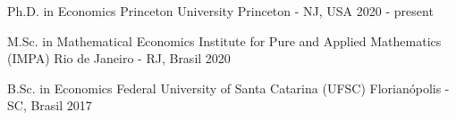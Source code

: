 

\begin{cventries}

    \cventry
    {Ph.D. in Economics} %
    {Princeton University} %
    {Princeton - NJ, USA} %
    {2020 - present} %
    {
    }
    
 \cventry
    {M.Sc. in Mathematical Economics} %
    {Institute for Pure and Applied Mathematics (IMPA)} %
    {Rio de Janeiro - RJ, Brasil} %
    {2020} %
    {
    }
    
 \cventry
    {B.Sc. in Economics} 
    {Federal University of Santa Catarina (UFSC)} %
    {Florianópolis - SC, Brasil} %
    {2017} %
    {
    }


\end{cventries}
